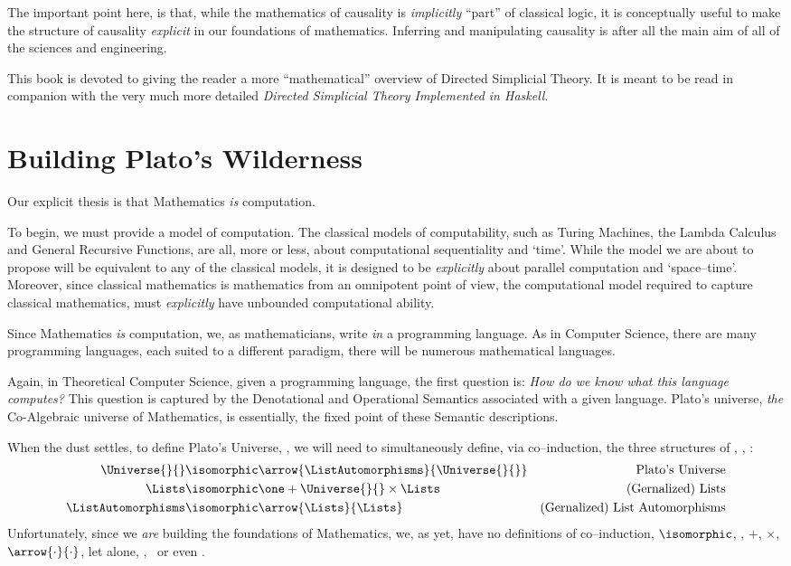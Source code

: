 \documentclass[a4paper,openany]{amsbook}
\begin{document}
The important point here, is that, while the mathematics of causality is
\emph{implicitly} ``part'' of classical logic, it is conceptually useful to make
the structure of causality \emph{explicit} in our foundations of mathematics. 
Inferring and manipulating causality is after all the main aim of all of the
sciences and engineering.

This book is devoted to giving the reader a more ``mathematical'' overview of
Directed Simplicial Theory.  It is meant to be read in companion with the very
much more detailed \textit{Directed Simplicial Theory Implemented in Haskell}.

\section{Building Plato's Wilderness}

Our explicit thesis is that Mathematics \emph{is} computation.

To begin, we must provide a model of computation. The classical models of
computability, such as Turing Machines, the Lambda Calculus and General
Recursive Functions, are all, more or less, about computational sequentiality
and `time'. While the model we are about to propose will be equivalent to any of
the classical models, it is designed to be \emph{explicitly} about parallel
computation and `space--time'. Moreover, since classical mathematics is
mathematics from an omnipotent point of view, the computational model required
to capture classical mathematics, must \emph{explicitly} have unbounded
computational ability.

Since Mathematics \emph{is} computation, we, as mathematicians, write \emph{in}
a programming language. As in Computer Science, there are many programming
languages, each suited to a different paradigm, there will be numerous
mathematical languages.

Again, in Theoretical Computer Science, given a programming language, the first
question is: \emph{How do we know what this language computes?} This question is
captured by the Denotational and Operational Semantics associated with a given
language. Plato's universe, \emph{the} Co-Algebraic universe of Mathematics,
is essentially, the fixed point of these Semantic descriptions.

When the dust settles, to define Plato's Universe, \Universe{}{}, we will need to
simultaneously define, via co--induction, the three structures of \Universe{}{},
\Lists, \ListAutomorphisms:
%
\begin{align}
   \Universe{}{}          & \isomorphic \arrow{\ListAutomorphisms}{\Universe{}{}} & 
   \text{Plato's Universe} \\
   \Lists             & \isomorphic \one + \Universe{}{} \times \Lists        & 
   \text{(Gernalized) Lists} \\
   \ListAutomorphisms & \isomorphic \arrow{\Lists}{\Lists}                & \text{(Gernalized) List Automorphisms}
\end{align}
%
Unfortunately, since we \emph{are} building the foundations of Mathematics, we,
as yet, have no definitions of co--induction, $\isomorphic$, \one, $+$, $\times$,
$\arrow{\cdot}{\cdot}$, let alone, \Universe{}{}, \Lists\ or even \ListAutomorphisms.
\end{document}
